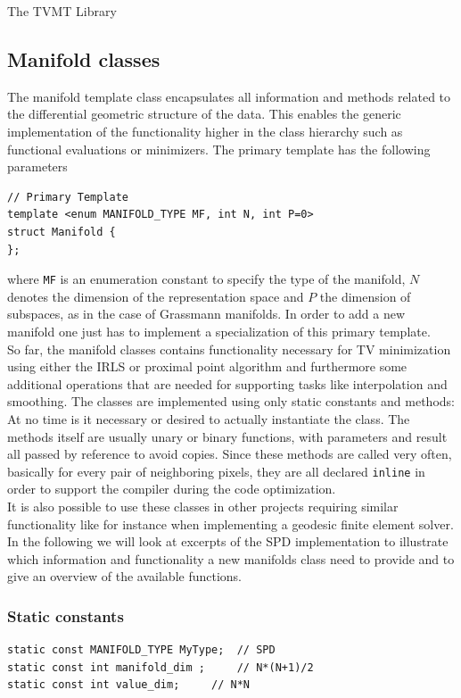 \begin{chapter}{The TVMT Library}
\subsection{Manifold classes} %
\label{sub:Manifold classes}
The manifold template class encapsulates all information and methods related to the differential geometric structure of the data. 
This enables the generic implementation of the functionality higher in the class hierarchy such as functional evaluations or minimizers.
The primary template has the following parameters
\cppinline
\begin{lstlisting}
// Primary Template
template <enum MANIFOLD_TYPE MF, int N, int P=0>
struct Manifold {
}; 
\end{lstlisting}
where \texttt{MF} is an enumeration constant to specify the type of the manifold, $N$ denotes the dimension of the representation space and $P$ the dimension of subspaces,
as in the case of Grassmann manifolds. In order to add a new manifold one just has to implement a specialization of this primary template.\\

So far, the manifold classes contains functionality necessary for TV minimization using either the IRLS or proximal point algorithm and furthermore some additional operations
that are needed for supporting tasks like interpolation and smoothing. The classes are implemented using only static constants and methods: At no time is it necessary or 
desired to actually instantiate the class. The methods itself are usually unary or binary functions, with parameters and result all passed by reference to avoid copies.
Since these methods are called very often, basically for every pair of neighboring pixels, they are all declared \texttt{inline} in order to support the compiler during 
the code optimization.\\

It is also possible to use these classes in other projects requiring similar functionality like 
for instance when implementing a geodesic finite element solver.\\

In the following we will look at excerpts of the SPD implementation to illustrate which information and functionality a new manifolds class need to provide and to give an overview
of the available functions.

\subsubsection{Static constants} %
\label{ssub:Static constants}
\cppinline
\begin{lstlisting}
static const MANIFOLD_TYPE MyType;	// SPD
static const int manifold_dim ;		// N*(N+1)/2
static const int value_dim;		// N*N


\end{lstlisting}
\end{chapter}
